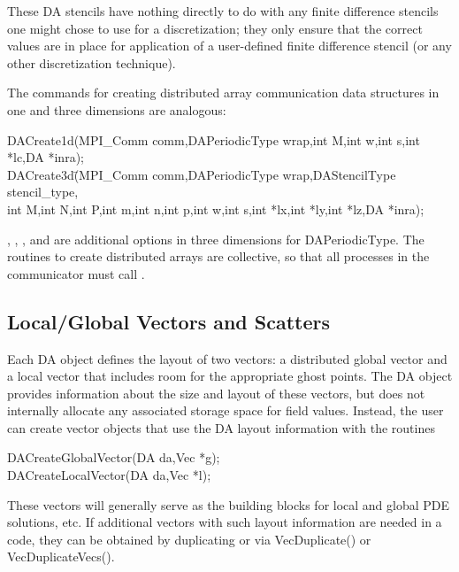 These DA stencils have nothing directly to do with any finite
difference stencils one might chose to use for a discretization; they
only ensure that the correct values are in place for application of a
user-defined finite difference stencil (or any other
discretization technique).

The commands for creating distributed array communication data structures
in one and three dimensions are analogous:
  
\begin{tabbing}
  DACreate1d(MPI\_Comm comm,DAPeriodicType wrap,int M,int w,int s,int *lc,DA *inra);\\
  DACreate3d\=(MPI\_Comm comm,DAPeriodicType wrap,DAStencilType stencil\_type,\\
             \>int M,int N,int P,int m,int n,int p,int w,int s,int *lx,int *ly,int *lz,DA *inra);
\end{tabbing}
, 
, 
, and 
 
are additional options in three dimensions for DAPeriodicType.
The routines to create distributed arrays are collective, so that all
processes in the communicator  must call .

\subsection{Local/Global Vectors and Scatters}

Each DA object defines the layout of two vectors: a distributed
global vector and a local vector that includes room for the
appropriate ghost points.  The DA object provides information
about the size and layout of these vectors, but does not internally
allocate any associated storage space for field values.  Instead, the
user can create vector objects that use the DA layout
information with the routines
\begin{tabbing}
  DACreateGlobalVector(DA da,Vec *g);\\
  DACreateLocalVector(DA da,Vec *l);
\end{tabbing}
These vectors will generally serve as the building blocks for local
and global PDE solutions, etc.  If additional vectors with such
layout information are needed in a code, they can be obtained by
duplicating  or  via
VecDuplicate() or VecDuplicateVecs().


